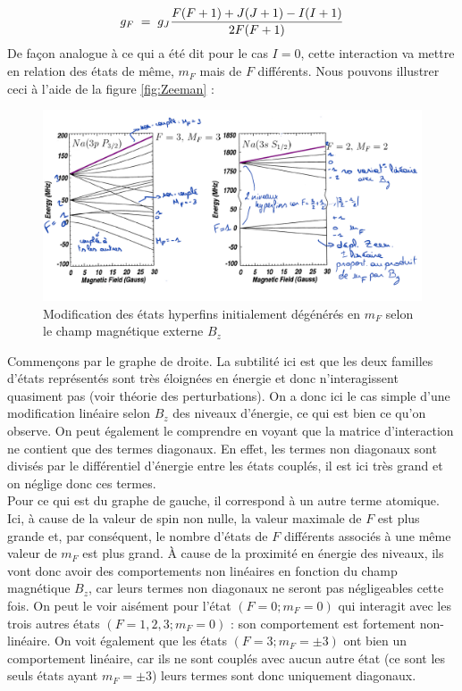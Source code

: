 \[
    g_F \; = \;  g_J \dfrac{F(F+1) + J(J+1) - I(I+1)}{2F(F+1)}
\]
De façon analogue à ce qui a été dit pour le cas $I=0$, cette interaction va mettre en relation des états de même, $m_F$ mais de $F$ différents. Nous pouvons illustrer ceci à l'aide de la figure \eqref{fig:Zeeman} :
\begin{figure}[htp]
    \centering
    \includegraphics[width=\textwidth]{Images2/ZeemanHyperfin.PNG}
    \caption{Modification des états hyperfins initialement dégénérés en $m_F$ selon le champ magnétique externe $B_z$}
    \label{fig:Zeeman}
\end{figure}
Commençons par le graphe de droite. La subtilité ici est que les deux familles d'états représentés sont très éloignées en énergie et donc n'interagissent quasiment pas (voir théorie des perturbations). On a donc ici le cas simple d'une modification linéaire selon $B_z$ des niveaux d'énergie, ce qui est bien ce qu'on observe. On peut également le comprendre en voyant que la matrice d'interaction ne contient que des termes diagonaux. En effet, les termes non diagonaux sont divisés par le différentiel d'énergie entre les états couplés, il est ici très grand et on néglige donc ces termes.\\

Pour ce qui est du graphe de gauche, il correspond à un autre terme atomique. Ici, à cause de la valeur de spin non nulle, la valeur maximale de $F$ est plus grande et, par conséquent, le nombre d'états de $F$ différents associés à une même valeur de $m_F$ est plus grand. À cause de la proximité en énergie des niveaux, ils vont donc avoir des comportements non linéaires en fonction du champ magnétique $B_z$, car leurs termes non diagonaux ne seront pas négligeables cette fois. On peut le voir aisément pour l'état $(F = 0;m_F = 0)$ qui interagit avec les trois autres états $(F=1,2,3;m_F = 0)$ : son comportement est fortement non-linéaire. On voit également que les états $(F = 3;m_F = \pm3)$ ont bien un comportement linéaire, car ils ne sont couplés avec aucun autre état (ce sont les seuls états ayant $m_F=\pm3$) leurs termes sont donc uniquement diagonaux.\\

